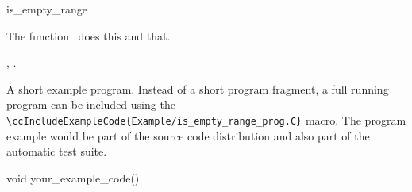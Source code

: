 
\gdef\ccRefPageBegin{\ccParDims\cgalColumnLayout\begin{ccAdvanced}}
\gdef\ccRefPageEnd{\ccParDims\cgalColumnLayout\end{ccAdvanced}}
\begin{ccRefFunction}{is_empty_range}  %


\ccDefinition
  
The function \ccRefName\ does this and that.



\ccIsModel


\ccSeeAlso

,
.

\ccExample

A short example program.
Instead of a short program fragment, a full running program can be
included using the 
\verb|\ccIncludeExampleCode{Example/is_empty_range_prog.C}| 
macro. The program example would be part of the source code distribution and
also part of the automatic test suite.

\begin{ccExampleCode}
void your_example_code() {
}
\end{ccExampleCode}


\end{ccRefFunction}
\gdef\ccRefPageBegin{\ccParDims\cgalColumnLayout}
\gdef\ccRefPageEnd{\ccParDims\cgalColumnLayout}



